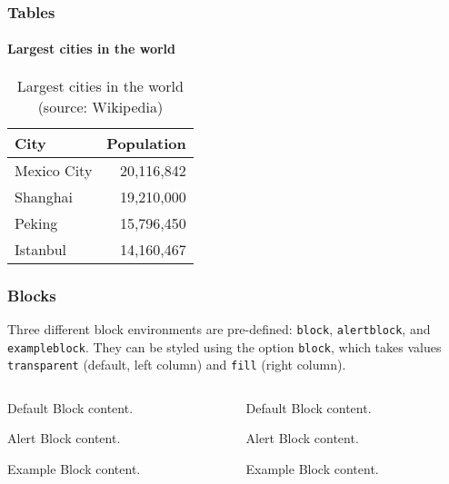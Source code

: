 \documentclass[10pt]{beamer}
\begin{document}
\begin{frame}
  \frametitle{Tables}
  \framesubtitle{Largest cities in the world}
  \begin{table}
    \caption{Largest cities in the world (source: Wikipedia)}
    \begin{tabular}{@{} lr @{}}
      \toprule
      City        & Population \\
      \midrule
      Mexico City & 20,116,842 \\
      Shanghai    & 19,210,000 \\
      Peking      & 15,796,450 \\
      Istanbul    & 14,160,467 \\
      \bottomrule
    \end{tabular}
  \end{table}
\end{frame}
\begin{frame}[fragile]
  \frametitle{Blocks}
  Three different block environments are pre-defined: \verb|block|, \verb|alertblock|,
  and \verb|exampleblock|. They can be styled using the option
  \verb|block|, which takes values \verb|transparent| (default, left column) and \verb|fill| (right column).

  \begin{columns}[T]
    \begin{column}{0.45\textwidth}
      \begin{block}{Default}
        Block content.
      \end{block}

      \begin{alertblock}{Alert}
        Block content.
      \end{alertblock}

      \begin{exampleblock}{Example}
        Block content.
      \end{exampleblock}
    \end{column}
    \begin{column}{0.45\textwidth}
      {

        \begin{block}{Default}
          Block content.
        \end{block}

        \begin{alertblock}{Alert}
          Block content.
        \end{alertblock}

        \begin{exampleblock}{Example}
          Block content.
        \end{exampleblock}
      }
    \end{column}
  \end{columns}
\end{frame}
\end{document}
